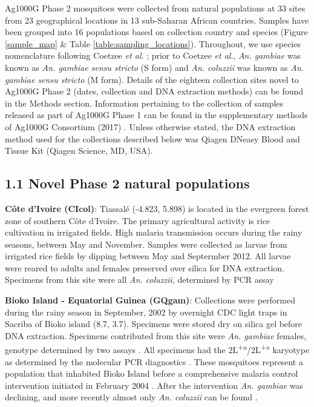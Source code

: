 \documentclass[a4paper,11pt,abstracton,hidelinks]{scrartcl}
\begin{document}
%
Ag1000G Phase 2 mosquitoes were collected from natural populations at 33 sites from 23
geographical locations in 13 sub-Saharan African countries. 
%
Samples have been grouped into 16 populations based on collection country and species (Figure \ref{sample_map} \& Table \ref{table:sampling_locations}).
%
Throughout, we use species nomenclature following Coetzee \textit{et al}. \cite{Coetzee2013};	
%
prior to	 Coetzee	 \textit{et al}., \textit{An. gambiae} was known as \textit{An. gambiae sensu stricto} (S form) and \textit{An. coluzzii} was known as \textit{An. gambiae sensu stricto} (M form).
%
Details of the eighteen collection sites novel to Ag1000G Phase 2 (dates, collection and DNA extraction methods) can be found in the Methods section.
%
Information pertaining to the collection of samples released as part of Ag1000G Phase 1 can be found in the supplementary methods of Ag1000G Consortium (2017) \cite{Ag1000gConsortium2017}.
%
Unless otherwise stated, the DNA extraction method used for the collections described below was Qiagen DNeasy Blood and Tissue Kit (Qiagen Science, MD, USA).

\subsection*{1.1 Novel Phase 2 natural populations}
%
\textbf{C\^{o}te d'Ivoire (CIcol)}: Tiassal\'{e} (-4.823, 5.898) is located in the evergreen forest zone of southern C\^{o}te d'Ivoire.
%
The primary agricultural activity is rice cultivation in irrigated fields.
%
High malaria transmission occurs during the rainy seasons, between May and November.
%
Samples were collected as larvae from irrigated rice fields by dipping between May and Septermber 2012.
%
All larvae were reared to adults and females preserved over silica for DNA extraction.
%
Specimens from this site were all \textit{An. coluzzii}, determined by PCR assay \cite{Santolamazza2008}

\textbf{Bioko Island - Equatorial Guinea (GQgam)}: Collections were performed during the rainy season in September, 2002 by overnight CDC light traps in Sacriba of Bioko island (8.7, 3.7).
%
Specimens were stored dry on silica gel before DNA extraction.
%
Specimens contributed from this site were \textit{An. gambiae} females, genotype determined by two assays \cite{Scott1993, Santolamazza2004}.
%
All specimens had the 2L\textsuperscript{+a}/2L\textsuperscript{+a} karyotype as determined by the molecular PCR diagnostics \cite{White2007}. 
%
These mosquitoes represent a population that inhabited Bioko Island before a comprehensive malaria control intervention initiated in February 2004 \cite{Sharp2007}. 
%
After the intervention \textit{An. gambiae} was declining, and more recently almost only \textit{An. coluzzii} can be found \cite{Overgaard2012}.
\end{document}
